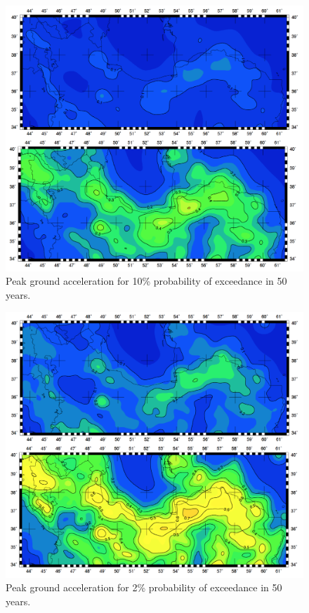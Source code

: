 \begin{figure} [!ht]
\centering
\includegraphics[scale=0.3]{figures/pdf/pga_10_mean.pdf} 
\caption{Peak ground acceleration for 10\% probability of exceedance in 50 years.}
\label{fig:pga_10_mean}
\end{figure}

\begin{figure} [!ht]
\centering
\includegraphics[scale=0.3]{figures/pdf/pga_2_mean.pdf} 
\caption{Peak ground acceleration for 2\% probability of exceedance in 50 years.}
\label{fig:pga_2_mean}
\end{figure}



